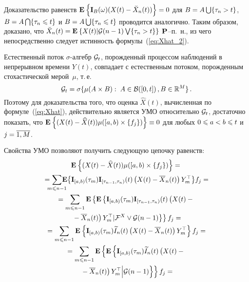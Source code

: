 \begin{multicols}{2}
{ Доказательство равенств $\me{}{\mathbf{I}_B(\omega)(X(t)\hm-\breve{X}_n(t))}\hm=0$
 для $B \hm= A \bigcup \{\tau_n > t\}$, $B \hm= A \bigcap
 \{\tau_n \hm\leqslant t\}$ и $B \hm= A \bigcup \{\tau_n \hm\leqslant t\}$
 проводится аналогично. Таким образом, доказано, что $\breve{X}_n(t) \hm=
 \me{}{X(t)|\G (n-1) \bigvee \{\tau_n > t\}}$ ${\mathbf P}$--п.~н., из чего
 непосредственно следует истинность формулы~(\ref{eq:Xhat_2}).

 Естественный поток $\sigma$-алгебр ${\mathcal G}_t$,
 порожденный процессом наблюдений в непрерывном времени $Y(t)$, совпадает с
 естественным потоком, порожденным стохастической мерой~$\mu$, т.\,е.\
 \begin{equation*}
 {\mathcal G}_t = \sigma\{\mu(A \times B):\; A \in \mathcal{B}([0,t])\,,
 B \in \mathbb{R}^M\}\,.
 \end{equation*}
 Поэтому для доказательства того, что оценка $\widehat{X}(t)$,
 вычисленная по формуле~(\ref{eq:Xhat}), действительно является УМО
 относительно ${\mathcal G}_t$, достаточно показать, что
 $\me{}{(X(t) \hm- \widehat{X}(t))\mu([a,b) \times\{f_j\})}\hm\equiv 0$
 для любых $0 \hm\leqslant a \hm< b \hm\leqslant t$ и $j\hm=\overline{1,M}$.

 Свойства УМО позволяют получить следующую цепочку равенств:
 \begin{multline*}
 \me{}{(X(t) - \widehat{X}(t))\mu([a,b) \times\{f_j\})} ={} \\
 {}=\!\!\!\!
 \sum\limits_{m \leqslant n-1}\!\!\!\!\!\mathbf{E}\!\left\{\mathbf{I}_{[a,b)}(\tau_m)
 \mathbf{I}_{[\tau_{n-1},\tau_n)}(t)\left(X(t)-
 \overline{X}_n(t)\right)Y_m^{\top}\right\}\!f_j={}\hspace*{-0.13318pt}\\
 {}=  \sum\limits_{m \leqslant n-1}
 \mathbf{E}\left\{\mathbf{E}\left\{
 \mathbf{I}_{[a,b)}(\tau_m)\mathbf{I}_{[\tau_{n-1},\tau_n)}(t)
 \left(X(t)-\vphantom{\overline{X_n}}
  {}\right.\right.\right.\\
\left.\left.\left. {}- \overline{X}_n(t)\right)Y_m^{\top}|\ff^X\vee\G(n-1)\right\}\right\}f_j={}\\
{} =  \sum\limits_{m \leqslant n-1}\me{}{\mathbf{I}_{[a,b)}(\tau_m)
 \widetilde{I}_n(t)\left(X(t)-
 \overline{X}_n(t)\right)Y_m^{\top}  }f_j={}\\
 {}=  \sum\limits_{m \leqslant n-1}
 \mathbf{E}\left\{\mathbf{E}\left\{\mathbf{I}_{[a,b)}(\tau_m)
 \widetilde{I}_n(t)\left(\vphantom{\overline{X}_n}
 X(t)- {}\right.\right.\right.\\
 \left.\left.\left. {}- \overline{X}_n(t)\right)Y_m^{\top}
 \Big\vert\G(n-1)\right\}\right\}f_j={}
 \end{multline*}

}
\end{multicols}
